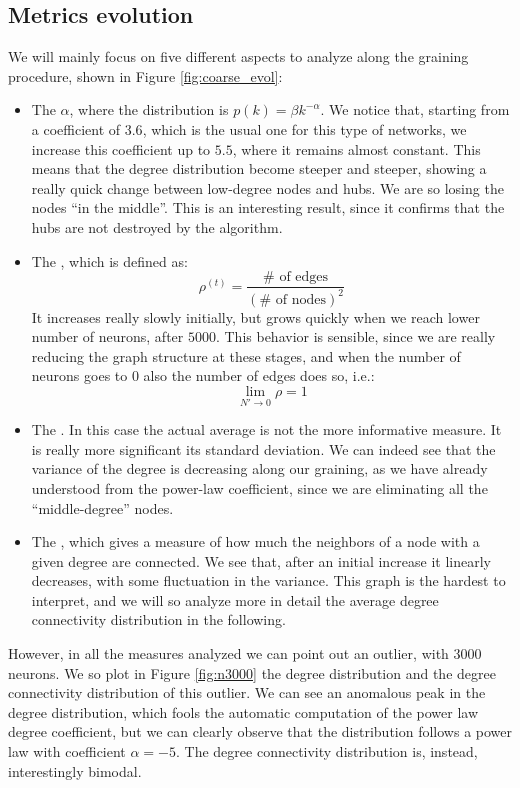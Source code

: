 \subsection{Metrics evolution}
We will mainly focus on five different aspects to analyze along the graining procedure, shown in
Figure \ref{fig:coarse_evol}:
\begin{itemize}
    \item The  $\alpha$, where the 
        distribution is $p(k)=\beta k^{-\alpha}$. We notice that, starting from a coefficient
        of $3.6$, which is the usual one for this type of networks, we increase this coefficient up to 
        $5.5$, where it remains almost constant. This means that the degree distribution become steeper 
        and steeper, showing a really quick change between low-degree nodes and hubs. We are so losing 
        the nodes “in the middle”. This is an interesting result, since it confirms that 
        the hubs are not destroyed by the algorithm.
    \item The , which is defined as:
        \begin{equation}
            \rho^{(t)}=\frac{\# \mbox{ of edges}}{(\# \mbox{ of nodes})^2}
        \end{equation}
        It increases really slowly initially, but grows quickly when we 
        reach lower number of neurons, after $5000$. This behavior is sensible, since we are really
        reducing the graph structure at these stages, and when the number of neurons goes to $0$ also
        the number of edges does so, i.e.:
        $$
        \lim_{N'\rightarrow 0} \rho = 1
        $$
    \item The . In this case the actual average is not the more informative measure. It is really more 
        significant its standard deviation. We can indeed see that the variance of the degree is decreasing 
        along our graining, as we have already understood from the power-law coefficient, since
        we are eliminating all the “middle-degree” nodes. 
    \item The , which gives a measure of how much 
        the neighbors of a node with a given degree are connected. We see that, after an initial 
        increase it linearly decreases, with some fluctuation in the variance. This graph is the hardest to
        interpret, and we will so analyze more in detail the average degree connectivity distribution in the 
        following.
\end{itemize}
However, in all the measures analyzed we can point out an outlier, with $3000$ neurons. 
We so plot in Figure \ref{fig:n3000} the degree distribution and the degree connectivity distribution of this outlier.
We can see an anomalous peak in the degree distribution, which fools the automatic computation of the 
power law degree coefficient, but we can clearly observe that the distribution follows a power law
with coefficient $\alpha=-5$. The degree connectivity distribution is, instead, interestingly bimodal.

